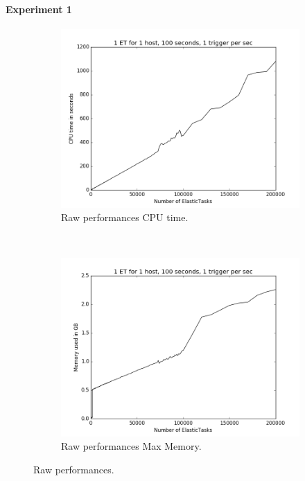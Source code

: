 \documentclass[a4paper, onecolumn, 11pt]{article}
\begin{document}
    \paragraph{Experiment 1}
    \begin{figure}
    	\centering
    	\hspace*{-4em}
    	\begin{subfigure}[t]{0.6\textwidth}
    		\includegraphics[width=\textwidth]{../plots/raw_perf_time}
    		\caption{Raw performances CPU time.}
    		\label{time_raw}
    	\end{subfigure}%
    	~
    	\begin{subfigure}[t]{0.6\textwidth}
    		\includegraphics[width=\textwidth]{../plots/raw_perf_mem}
    		\caption{Raw performances Max Memory.}
    		\label{mem_raw}
    	\end{subfigure}%
    	\caption{Raw performances.}
    \end{figure}
    
\end{document}
